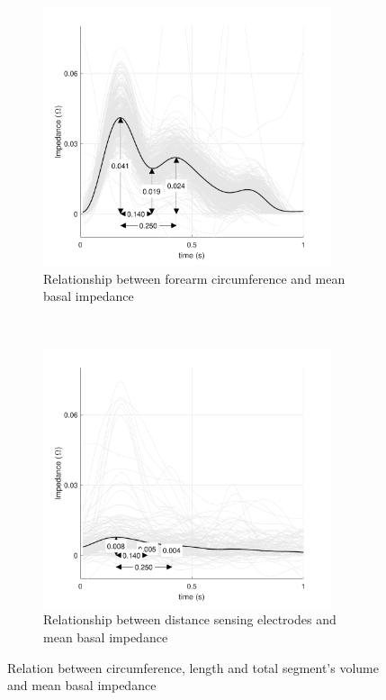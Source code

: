 \begin{figure}[t!]
	\centering
	\begin{subfigure}[t]{0.5\textwidth}
		\centering
		\includegraphics[height=7.6cm]{figure10a}
		\caption{Relationship between forearm circumference and mean basal impedance}
		\label{fig:iPG_arterial_baseline}
	\end{subfigure}%
	~ 
	\begin{subfigure}[t]{0.5\textwidth}
		\centering
		\includegraphics[height=7.6cm]{figure10b}
		\caption{Relationship between distance sensing electrodes and mean basal impedance}
		\label{fig:iPG_arterial_occlusion}
	\end{subfigure}
	\caption{Relation between circumference, length and total segment's volume and mean basal impedance}
	\label{fig:iPG_arterial}
\end{figure}

